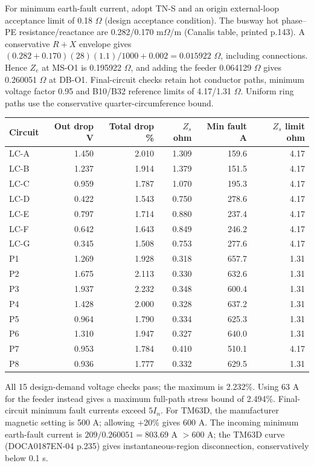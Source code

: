 For minimum earth-fault current, adopt TN-S and an origin external-loop acceptance limit of 0.18 $\Omega$ (design acceptance condition). The busway hot phase--PE resistance/reactance are 0.282/0.170 m$\Omega$/m (Canalis table, printed p.143). A conservative $R+X$ envelope gives $(0.282+0.170)(28)(1.1)/1000+0.002=0.015922$ $\Omega$, including connections. Hence $Z_e$ at MS-O1 is 0.195922 $\Omega$, and adding the feeder 0.064129 $\Omega$ gives 0.260051 $\Omega$ at DB-O1. Final-circuit checks retain hot conductor paths, minimum voltage factor 0.95 and B10/B32 reference limits of 4.17/1.31 $\Omega$. Uniform ring paths use the conservative quarter-circumference bound.
\begingroup\small\renewcommand{\arraystretch}{1.0}
\begin{longtable}{lrrrrr}\toprule
Circuit & Out drop V & Total drop \% & $Z_s$ ohm & Min fault A & $Z_s$ limit ohm\\\midrule\endhead
LC-A & 1.450 & 2.010 & 1.309 & 159.6 & 4.17 \\
LC-B & 1.237 & 1.914 & 1.379 & 151.5 & 4.17 \\
LC-C & 0.959 & 1.787 & 1.070 & 195.3 & 4.17 \\
LC-D & 0.422 & 1.543 & 0.750 & 278.6 & 4.17 \\
LC-E & 0.797 & 1.714 & 0.880 & 237.4 & 4.17 \\
LC-F & 0.642 & 1.643 & 0.849 & 246.2 & 4.17 \\
LC-G & 0.345 & 1.508 & 0.753 & 277.6 & 4.17 \\
P1 & 1.269 & 1.928 & 0.318 & 657.7 & 1.31 \\
P2 & 1.675 & 2.113 & 0.330 & 632.6 & 1.31 \\
P3 & 1.937 & 2.232 & 0.348 & 600.4 & 1.31 \\
P4 & 1.428 & 2.000 & 0.328 & 637.2 & 1.31 \\
P5 & 0.964 & 1.790 & 0.334 & 625.3 & 1.31 \\
P6 & 1.310 & 1.947 & 0.327 & 640.0 & 1.31 \\
P7 & 0.953 & 1.784 & 0.410 & 510.1 & 4.17 \\
P8 & 0.936 & 1.777 & 0.332 & 629.5 & 1.31 \\
\bottomrule\end{longtable}
\endgroup
All 15 design-demand voltage checks pass; the maximum is 2.232\%. Using 63 A for the feeder instead gives a maximum full-path stress bound of 2.494\%. Final-circuit minimum fault currents exceed $5I_n$. For TM63D, the manufacturer magnetic setting is 500 A; allowing +20\% gives 600 A. The incoming minimum earth-fault current is $209/0.260051=803.69$ A $>600$ A; the TM63D curve (DOCA0187EN-04 p.235) gives instantaneous-region disconnection, conservatively below 0.1 s.
